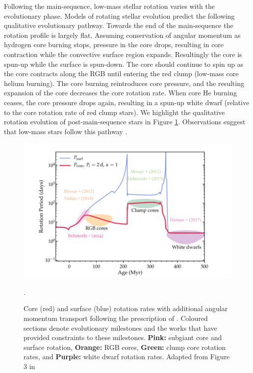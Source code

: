 Following the main-sequence, low-mass stellar rotation varies with the evolutionary phase.
Models of rotating stellar evolution \citep[see, e.g.,][]{maeder_evolution_2000,heger_presupernova_2000} predict the following qualitative evolutionary pathway.
Towards the end of the main-sequence the rotation profile is largely flat.
Assuming conservation of angular momentum as hydrogen core burning stops, pressure in the core drops, resulting in core contraction while the convective surface region expands.
Resultingly the core is spun-up while the surface is spun-down.
The core should continue to spin up as the core contracts along the RGB until entering the red clump (low-mass core helium burning).
The core burning reintroduces core pressure, and the resulting expansion of the core decreases the core rotation rate.
When core He burning ceases, the core pressure drops again, resulting in a spun-up white dwarf (relative to the core rotation rate of red clump stars).
We highlight the qualitative rotation evolution of post-main-sequence stars in Figure \ref{fig:poms_evo}.
Observations suggest that low-mass stars follow this pathway \citep{mosser_spin_2012,deheuvels_seismic_2014,deheuvels_seismic_2015,hermes_white_2017,gehan_core_2018,deheuvels_seismic_2020}.

\begin{figure}[h]
    \includegraphics[width=\textwidth]{Figures/intro_figures/qualitative_evo.png}
    \caption[Qualitative core and surface rotation rates of post-main-sequence stars.]{Core (red) and surface (blue) rotation rates with additional angular momentum transport following the prescription of \citet{spada_angular_2016}. Coloured sections denote evolutionary milestones and the works that have provided constraints to these milestones. \textbf{Pink:} subgiant core and surface rotation, \textbf{Orange:} RGB cores, \textbf{Green:} clump core rotation rates, and \textbf{Purple:} white dwarf rotation rates. Adapted from Figure 3 in \citet{fuller_slowing_2019}}.
    \label{fig:poms_evo}
\end{figure}


